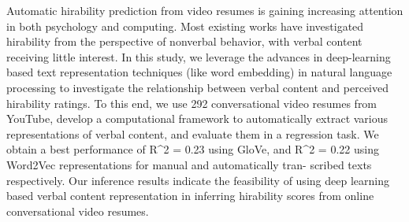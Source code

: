 Automatic hirability prediction from video resumes is gaining increasing attention in both psychology and computing. Most existing works have investigated hirability from the perspective of nonverbal behavior, with verbal content receiving little interest. In this study, we leverage the advances in deep-learning based text representation techniques (like word embedding) in natural language processing to investigate the relationship between verbal content and perceived hirability ratings. To this end, we use 292 conversational video resumes from YouTube, develop a computational framework to automatically extract various representations of verbal content, and evaluate them in a regression task. We obtain a best performance of R^2 = 0.23 using GloVe, and R^2 = 0.22 using Word2Vec representations for manual and automatically tran- scribed texts respectively. Our inference results indicate the feasibility of using deep learning based verbal content representation in inferring hirability scores from online conversational video resumes.
